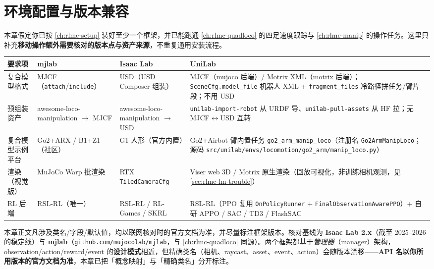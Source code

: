 \section{环境配置与版本兼容}
\label{sec:rlmc-lm-setup}

本章假定你已按 \cref{ch:rlmc-setup} 装好至少一个框架，并已能跑通 \cref{ch:rlmc-quadloco} 的四足速度跟踪与 \cref{ch:rlmc-manip} 的操作任务。这里只补充\textbf{移动操作额外需要核对的版本点与资产来源}，不重复通用安装流程。

\begin{center}
\small
\begin{tabular}{@{}p{2.4cm}p{3.2cm}p{3.2cm}p{4.4cm}@{}}
\toprule
要求项 & mjlab & Isaac Lab & UniLab \\
\midrule
复合模型格式 & MJCF（\verb|attach|/\verb|include|） & USD（USD Composer 组装） & MJCF（mujoco 后端）/ Motrix XML（motrix 后端）；\verb|SceneCfg.model_file| 机器人 XML + \verb|fragment_files| 冷路径拼任务/臂片段；不用 USD\,\cite{unilab2026} \\
预组装资产 & awesome-loco-manipulation $\to$ MJCF & awesome-loco-manipulation $\to$ USD & \verb|unilab-import-robot| 从 URDF 导、\verb|unilab-pull-assets| 从 HF 拉；无 MJCF$\leftrightarrow$USD 互转 \\
复合模型示例平台 & Go2+ARX / B1+Z1（社区） & G1 人形（官方内置） & Go2+Airbot 臂内置任务 \verb|go2_arm_manip_loco|（注册名 \verb|Go2ArmManipLoco|；源码 \verb|src/unilab/envs/locomotion/go2_arm/manip_loco.py|）\,\cite{unilab2026} \\
渲染（视觉版） & MuJoCo Warp 批渲染 & RTX \verb|TiledCameraCfg| & Viser web 3D / Motrix 原生渲染（回放可视化，非训练相机观测，见 \cref{sec:rlmc-lm-trouble}） \\
RL 后端 & RSL-RL（唯一） & RSL-RL / RL-Games / SKRL & RSL-RL（PPO 复用 \verb|OnPolicyRunner| + \verb|FinalObservationAwarePPO|）+ 自研 APPO / SAC / TD3 / FlashSAC \\
\bottomrule
\end{tabular}
\end{center}

\begin{note}
本章正文凡涉及类名/字段/默认值，均以联网核对时的官方文档为准，并尽量标注框架版本。核对基线为 \textbf{Isaac Lab 2.x}（截至 2025--2026 的稳定线）与 \textbf{mjlab}（\verb|github.com/mujocolab/mjlab|，与 \cref{ch:rlmc-quadloco} 同源）。两个框架都基于\emph{管理器}（manager）架构，observation/action/reward/event 的\textbf{设计模式}相近，但精确类名（相机、raycast、asset、event、action）会随版本漂移——\textbf{API 名以你所用版本的官方文档为准}，本章已把「概念映射」与「精确类名」分开标注。
\end{note}

